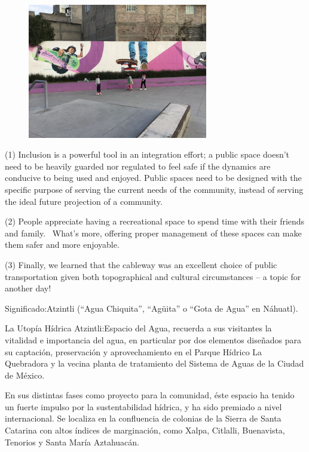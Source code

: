 \documentclass[letter]{ourGreenwayBrand}
\begin{document}
\begin{figure}[htbp]
  \centering
  \includegraphics[width=0.7\textwidth]{images/IMG_8051-2048x1536.jpg}
\end{figure}

(1) Inclusion is a powerful tool in an integration effort; a public space doesn’t need to be heavily guarded nor regulated to feel safe if the dynamics are conducive to being used and enjoyed. Public spaces need to be designed with the specific purpose of serving the current needs of the community, instead of serving the ideal future projection of a community.

(2) People appreciate having a recreational space to spend time with their friends and family.  What’s more, offering proper management of these spaces can make them safer and more enjoyable.

(3) Finally, we learned that the cableway was an excellent choice of public transportation given both topographical and cultural circumstances – a topic for another day!

Significado:Atzintli (“Agua Chiquita”, “Agüita” o “Gota de Agua” en Náhuatl).

La Utopía Hídrica Atzintli:Espacio del Agua, recuerda a sus visitantes la vitalidad e importancia del agua, en particular por dos elementos diseñados para su captación, preservación y aprovechamiento en el Parque Hídrico La Quebradora y la vecina planta de tratamiento del Sistema de Aguas de la Ciudad de México.

En sus distintas fases como proyecto para la comunidad, éste espacio ha tenido un fuerte impulso por la sustentabilidad hídrica, y ha sido premiado a nivel internacional. Se localiza en la confluencia de colonias de la Sierra de Santa Catarina con altos índices de marginación, como Xalpa, Citlalli, Buenavista, Tenorios y Santa María Aztahuacán.
\end{document}
